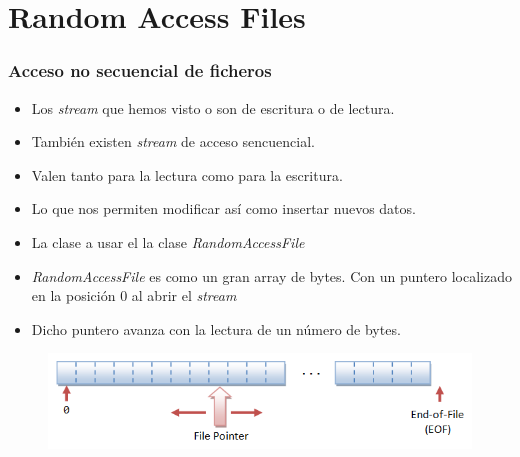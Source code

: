 \documentclass{beamer}
\begin{document}
\section{Random Access Files}
\begin{frame}[fragile]
\frametitle{Acceso no secuencial de ficheros}
\begin{itemize}[<+->]
\item Los \emph{stream} que hemos visto o son de escritura o de lectura.
\item También existen \emph{stream} de acceso sencuencial.
\item Valen tanto para la lectura como para la escritura.
\item Lo que nos permiten modificar así como insertar nuevos datos.
\item La clase a usar el la clase \emph{RandomAccessFile}
\item \emph{RandomAccessFile} es como un gran array de bytes. Con un puntero localizado en la posición 0 al abrir el \emph{stream}
\item Dicho puntero avanza con la lectura de un número de bytes.
\end{itemize}
\pause
\begin{figure}
\includegraphics[scale=0.6]{imagenes/random.png}
\end{figure}
\end{frame}
\end{document}
